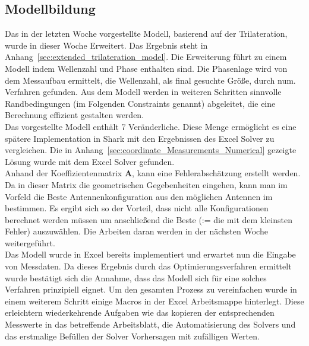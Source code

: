 \documentclass[a4paper,12pt,fleqn]{article}
\begin{document}
\subsection{Modellbildung}
Das in der letzten Woche vorgestellte Modell, basierend auf der Trilateration, wurde in dieser Woche Erweitert. Das Ergebnis steht in Anhang~\ref{sec:extended_trilateration_model}. Die Erweiterung führt zu einem Modell indem Wellenzahl und Phase enthalten sind. Die Phasenlage wird von dem Messaufbau ermittelt, die Wellenzahl, als final gesuchte Größe, durch num. Verfahren gefunden. Aus dem Modell werden in weiteren Schritten sinnvolle Randbedingungen (im Folgenden Constraints genannt) abgeleitet, die eine Berechnung effizient gestalten werden.\\
%
Das vorgestellte Modell enthält 7 Veränderliche. Diese Menge ermöglicht es eine spätere Implementation in Shark mit den Ergebnissen des Excel Solver zu vergleichen. Die in Anhang~\ref{sec:coordinate_Measurements_Numerical} gezeigte Lösung wurde mit dem Excel Solver gefunden. \\
%
 Anhand der Koeffizientenmatrix \textbf{A}, kann eine Fehlerabschätzung erstellt werden. Da in dieser Matrix die geometrischen Gegebenheiten eingehen, kann man im Vorfeld die Beste Antennenkonfiguration aus den möglichen Antennen im bestimmen. Es ergibt sich so der Vorteil, dass nicht alle Konfigurationen berechnet werden müssen um anschließend die Beste (:= die mit dem kleinsten Fehler) auszuwählen. Die Arbeiten daran werden in der nächsten Woche weitergeführt.\\
%
Das Modell wurde in Excel bereits implementiert und erwartet nun die Eingabe von Messdaten. Da dieses Ergebnis durch das Optimierungsverfahren ermittelt wurde bestätigt sich die Annahme, dass das Modell sich für eine solches Verfahren prinzipiell eignet. Um den gesamten Prozess zu vereinfachen wurde in einem weiterem Schritt einige Macros in der Excel Arbeitsmappe hinterlegt. Diese erleichtern wiederkehrende Aufgaben wie das kopieren der entsprechenden Messwerte in das betreffende Arbeitsblatt, die Automatisierung des Solvers und das erstmalige Befüllen der Solver Vorhersagen mit zufälligen Werten. \\

\end{document}
